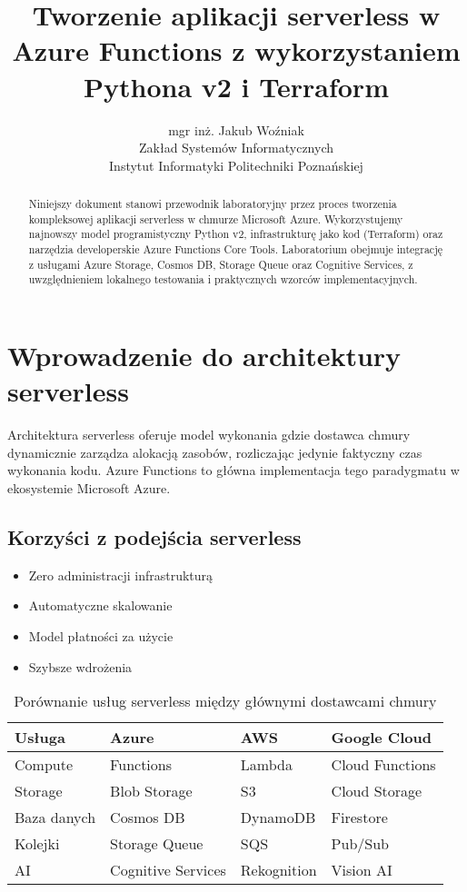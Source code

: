\documentclass{article}
\title{Tworzenie aplikacji serverless w Azure Functions z wykorzystaniem Pythona v2 i Terraform}
\author{mgr inż. Jakub Woźniak\\Zakład Systemów Informatycznych\\Instytut Informatyki Politechniki Poznańskiej}
\date{}
\begin{document}
\maketitle

\begin{abstract}
Niniejszy dokument stanowi przewodnik laboratoryjny przez proces tworzenia kompleksowej aplikacji serverless w chmurze Microsoft Azure. Wykorzystujemy najnowszy model programistyczny Python v2, infrastrukturę jako kod (Terraform) oraz narzędzia developerskie Azure Functions Core Tools. Laboratorium obejmuje integrację z usługami Azure Storage, Cosmos DB, Storage Queue oraz Cognitive Services, z uwzględnieniem lokalnego testowania i praktycznych wzorców implementacyjnych.
\end{abstract}

\section{Wprowadzenie do architektury serverless}
Architektura serverless oferuje model wykonania gdzie dostawca chmury dynamicznie zarządza alokacją zasobów, rozliczając jedynie faktyczny czas wykonania kodu. Azure Functions to główna implementacja tego paradygmatu w ekosystemie Microsoft Azure.

\subsection{Korzyści z podejścia serverless}
\begin{itemize}
\item Zero administracji infrastrukturą
\item Automatyczne skalowanie
\item Model płatności za użycie
\item Szybsze wdrożenia
\end{itemize}

\begin{table}[ht]
\centering
\begin{tabularx}{\textwidth}{|l|X|X|X|}
\hline
\textbf{Usługa} & \textbf{Azure} & \textbf{AWS} & \textbf{Google Cloud} \\
\hline
Compute & Functions & Lambda & Cloud Functions \\
Storage & Blob Storage & S3 & Cloud Storage \\
Baza danych & Cosmos DB & DynamoDB & Firestore \\
Kolejki & Storage Queue & SQS & Pub/Sub \\
AI & Cognitive Services & Rekognition & Vision AI \\
\hline
\end{tabularx}
\caption{Porównanie usług serverless między głównymi dostawcami chmury}
\end{table}
\end{document}
